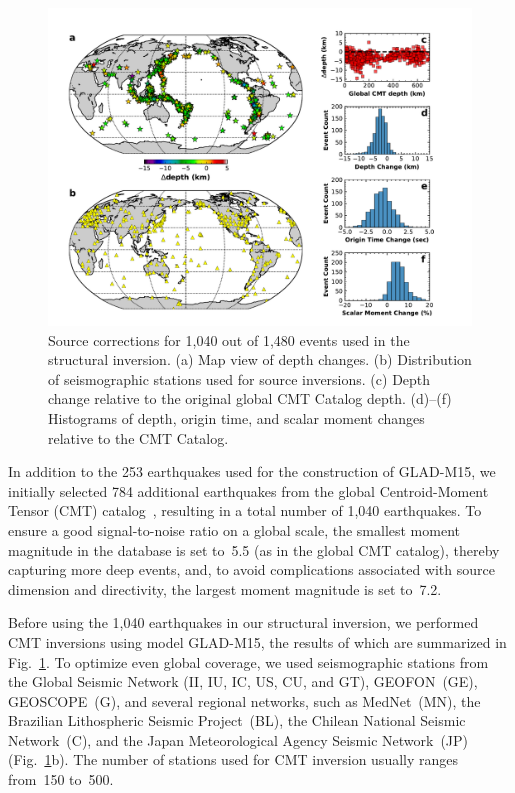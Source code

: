 \documentclass[extra,mreferee]{gji}
\begin{document}
\begin{figure}
  \centering
  \includegraphics[width=\textwidth]{figures/source_corrections.pdf}
  \caption{\small{Source corrections for 1,040 out of 1,480 events used in the structural inversion. (a) Map view of depth changes. (b) Distribution of seismographic stations used for source inversions. (c) Depth change relative to the original global CMT Catalog depth. (d)--(f) Histograms of depth, origin time, and scalar moment changes relative to the CMT Catalog.
  }}
  \label{fig:source_correction}
\end{figure}

In addition to the 253 earthquakes used for the construction of GLAD-M15, we initially selected 784 additional earthquakes
from the global Centroid-Moment Tensor (CMT) catalog~\citep[e.g.,][]{ekstrom2012global},
resulting in a total number of 1,040 earthquakes.
To ensure a good signal-to-noise ratio on a global scale,
the smallest moment magnitude in the database is set to~5.5 (as in the global CMT catalog),
thereby capturing more deep events,
and, to avoid complications associated with source dimension and directivity,
the largest moment magnitude is set to~7.2.

Before using the 1,040 earthquakes in our structural inversion,
we performed CMT inversions using model GLAD-M15,
the results of which are summarized in Fig.~\ref{fig:source_correction}.
To optimize even global coverage,
we used seismographic stations from the  Global Seismic Network (II, IU, IC, US, CU, and GT),
GEOFON~(GE), GEOSCOPE~(G), and several regional networks, such as MedNet~(MN),
the Brazilian Lithospheric Seismic Project~(BL), the Chilean National Seismic Network~(C),
and the Japan Meteorological Agency Seismic Network~(JP) (Fig.~\ref{fig:source_correction}b).
The number of stations used for CMT inversion usually ranges
from~150 to~500.
\end{document}
